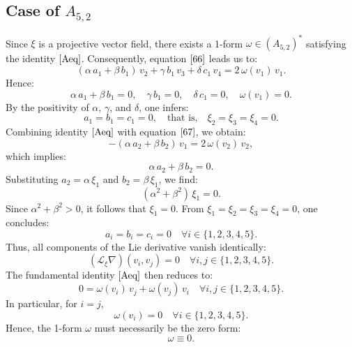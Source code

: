 \documentclass[10pt]{article}
\begin{document}
\subsection{Case of $A_{5,2}$}
Since \(\xi\) is a projective vector field, there exists a 1-form \(\omega \in (A_{5,2})^*\) satisfying the identity \(\eqref{Aeq}\). Consequently, equation \(\eqref{66}\) leads us to:
\[
(\alpha\,a_1 + \beta\,b_1)\,v_2 + \gamma\,b_1\,v_3 + \delta\,c_1\,v_4 = 2\,\omega(v_1)\,v_1.
\]
Hence:
\[
\alpha\,a_1 + \beta\,b_1 = 0, \quad
\gamma\,b_1 = 0, \quad
\delta\,c_1 = 0, \quad
\omega(v_1) = 0.
\]
By the positivity of \(\alpha\), \(\gamma\), and \(\delta\), one infers:
\[
a_1 = b_1 = c_1 = 0, \quad \text{that is,} \quad \xi_2 = \xi_3 = \xi_4 = 0.
\]
Combining identity \(\eqref{Aeq}\) with equation \(\eqref{67}\), we obtain:
\[
-(\alpha\,a_2 + \beta\,b_2)\,v_1 = 2\,\omega(v_2)\,v_2,
\]
which implies:
\[
\alpha\,a_2 + \beta\,b_2 = 0.
\]
Substituting \(a_2 = \alpha\,\xi_1\) and \(b_2 = \beta\,\xi_1\), we find:
\[
(\alpha^2 + \beta^2)\,\xi_1 = 0.
\]
Since \(\alpha^2 + \beta^2 > 0\), it follows that \(\xi_1 = 0\).
From \(\xi_1 = \xi_2 = \xi_3 = \xi_4 = 0\), one concludes:
\[
a_i = b_i = c_i = 0 \quad \forall i \in \{1,2,3,4,5\}.
\]
Thus, all components of the Lie derivative vanish identically:
\[
(\mathscr{L}_\xi\nabla)(v_i, v_j) = 0 \quad \forall i, j \in \{1,2,3,4,5\}.
\]
The fundamental identity \(\eqref{Aeq}\) then reduces to:
\[
0 = \omega(v_i)\,v_j + \omega(v_j)\,v_i \quad \forall i, j \in \{1,2,3,4,5\}.
\]
In particular, for \(i = j\),
\[
\omega(v_i) = 0 \quad \forall i \in \{1,2,3,4,5\}.
\]
Hence, the 1-form \(\omega\) must necessarily be the zero form:
\[
\omega \equiv 0.
\]
\end{document}
